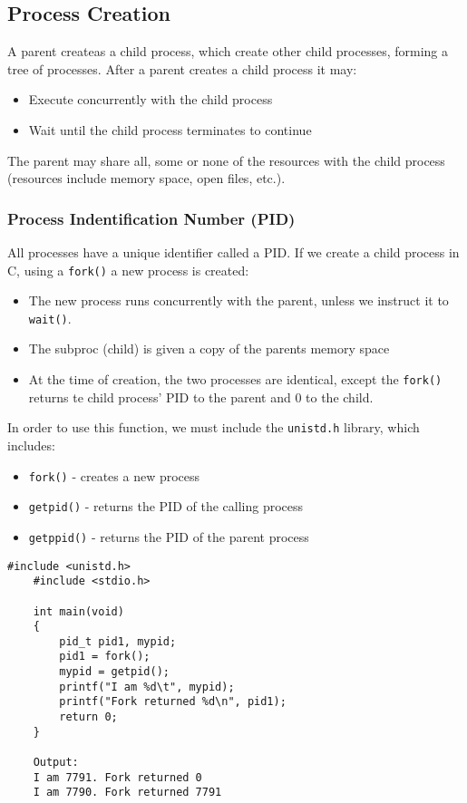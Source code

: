 \documentclass[a4paper, 10pt]{article}
\begin{document}
\subsection{Process Creation}
A parent createas a child process, which create other child processes, forming a tree of processes. After a parent creates a child process it may:
\begin{itemize}
    \item Execute concurrently with the child process
    \item Wait until the child process terminates to continue
\end{itemize}
The parent may share all, some or none of the resources with the child process (resources include memory space, open files, etc.).

\subsubsection{Process Indentification Number (PID)}
All processes have a unique identifier called a PID. If we create a child process in C, using a \texttt{fork()} a new process is created:
\begin{itemize}
    \item The new process runs concurrently with the parent, unless we instruct it to \texttt{wait()}.
    \item The subproc (child) is given a copy of the parents memory space
    \item At the time of creation, the two processes are identical, except the \texttt{fork()} returns te child process' PID to the parent and 0 to the child.
\end{itemize}
In order to use this function, we must include the \texttt{unistd.h} library, which includes:
\begin{itemize}
    \item \texttt{fork()} - creates a new process
    \item \texttt{getpid()} - returns the PID of the calling process
    \item \texttt{getppid()} - returns the PID of the parent process
\end{itemize}
\begin{lstlisting}[style=cStyle, caption={Forking a process}]
    #include <unistd.h>
    #include <stdio.h>

    int main(void)
    {
        pid_t pid1, mypid;
        pid1 = fork();
        mypid = getpid();
        printf("I am %d\t", mypid);
        printf("Fork returned %d\n", pid1);
        return 0;
    }

    Output:
    I am 7791. Fork returned 0
    I am 7790. Fork returned 7791
\end{lstlisting}
\end{document}
